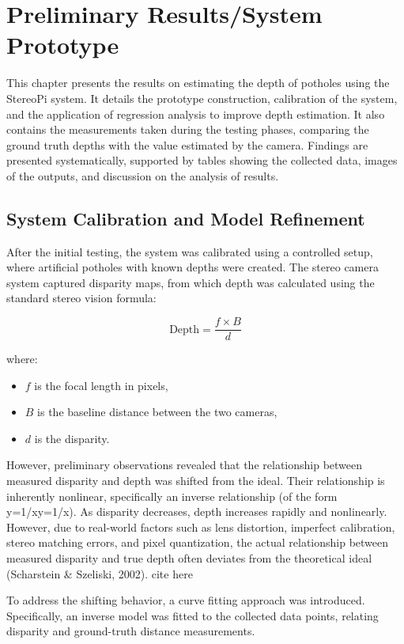 \chapter{Preliminary Results/System Prototype}
This chapter presents the results on estimating the depth of potholes using the StereoPi system. It details the prototype construction, calibration of the system, and the application of regression analysis to improve depth estimation. It also contains the measurements taken during the testing phases, comparing the ground truth depths with the value estimated by the camera. Findings are presented systematically, supported by tables showing the collected data, images of the outputs, and discussion on the analysis of results.

\section{System Calibration and Model Refinement}
After the initial testing, the system was calibrated using a controlled setup, where artificial potholes with known depths were created. The stereo camera system captured disparity maps, from which depth was calculated using the standard stereo vision formula:

\[
\text{Depth} = \frac{f \times B}{d}
\]

where:
\begin{itemize}
	\item \( f \) is the focal length in pixels,
	\item \( B \) is the baseline distance between the two cameras,
	\item \( d \) is the disparity.
\end{itemize}


However, preliminary observations revealed that the relationship between measured disparity and depth was shifted from the ideal. Their relationship is inherently nonlinear, specifically an inverse relationship (of the form y=1/xy=1/x). As disparity decreases, depth increases rapidly and nonlinearly. However, due to real-world factors such as lens distortion, imperfect calibration, stereo matching errors, and pixel quantization, the actual relationship between measured disparity and true depth often deviates from the theoretical ideal (Scharstein & Szeliski, 2002). cite here

To address the shifting behavior, a curve fitting approach was introduced. Specifically, an inverse model was fitted to the collected data points, relating disparity and ground-truth distance measurements.

